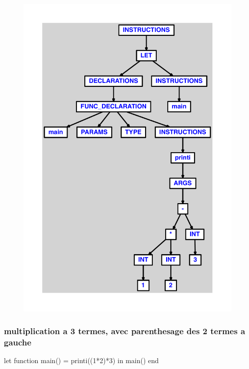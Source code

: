 \documentclass{article}
\begin{document}
\begin{figure}[H]\centering\includegraphics[max width=\textwidth]{ast/ast_100.pdf}\end{figure}\subsubsection{multiplication a 3 termes, avec parenthesage des 2 termes a gauche}
\begin{verbatimtab}
let function main() = printi((1*2)*3) in main() end
\end{verbatimtab}
\end{document}
